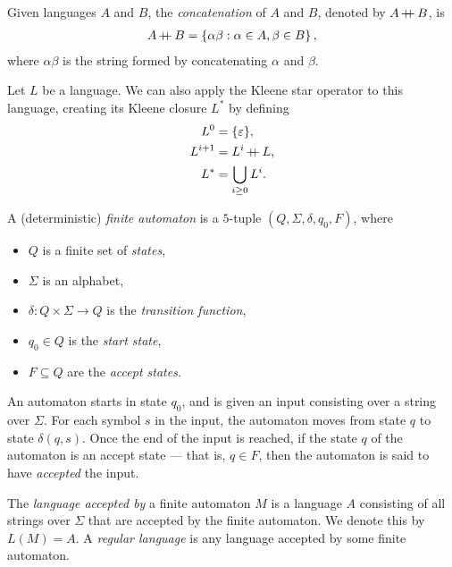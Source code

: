 \begin{defn}
    Given languages $A$ and $B$, the \emph{concatenation} of $A$ and $B$, denoted by $A \kern-0.2ex+\kern-1.5ex+\kern0.4ex B$, is
    \begin{align*}
        A \kern-0.2ex+\kern-1.5ex+\kern0.4ex B = \left\{\alpha\beta : \alpha \in A, \beta \in B \right\},
    \end{align*}
    where $\alpha\beta$ is the string formed by concatenating $\alpha$ and $\beta$.
\end{defn}

\begin{defn}
    Let $L$ be a language. We can also apply the Kleene star operator to this language, creating its Kleene closure $L^*$ by defining
    \begin{align*}
        L^0 &= \{\varepsilon\}, \\
        L^{i+1} &= L^{i} \kern-0.2ex+\kern-1.5ex+\kern0.4ex L, \\
        L^{*} &= \bigcup_{i \geq 0}L^{i}.
    \end{align*}
\end{defn}

\begin{defn}
    A (deterministic) \emph{finite automaton} is a $5$-tuple $(Q, \Sigma, \delta, q_0, F)$, where
    \begin{itemize}
        \item $Q$ is a finite set of \emph{states},
        \item $\Sigma$ is an alphabet,
        \item $\delta: Q \times \Sigma \to Q$ is the \emph{transition function},
        \item $q_0 \in Q$ is the \emph{start state},
        \item $F \subseteq Q$ are the \emph{accept states}.
    \end{itemize}
    An automaton starts in state $q_0$, and is given an input consisting over a string over $\Sigma$. For each symbol $s$ in the input, the automaton moves from state $q$ to state $\delta(q, s)$. Once the end of the input is reached, if the state $q$ of the automaton is an accept state --- that is, $q \in F$, then the automaton is said to have \emph{accepted} the input.
\end{defn}

\begin{defn}
    The \emph{language accepted by} a finite automaton $M$ is a language $A$ consisting of all strings over $\Sigma$ that are accepted by the finite automaton. We denote this by $L(M) = A$. A \emph{regular language} is any language accepted by some finite automaton.
\end{defn}

